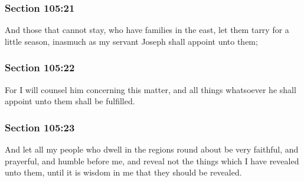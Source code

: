 	\subsubsection{Section 105:21} %
		\label{DC105-21}

		And those that cannot stay, who have families in the east, let them tarry for a little season, inasmuch as my servant Joseph shall appoint unto them;


	\subsubsection{Section 105:22} %
		\label{DC105-22}

		For I will counsel him concerning this matter, and all things whatsoever he shall appoint unto them shall be fulfilled.


	\subsubsection{Section 105:23} %
		\label{DC105-23}

		And let all my people who dwell in the regions round about be very faithful, and prayerful, and humble before me, and reveal not the things which I have revealed unto them, until it is wisdom in me that they should be revealed.


